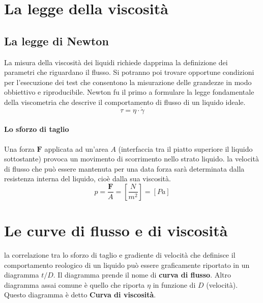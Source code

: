 \section{La legge della viscosità}
\subsection{La legge di Newton}
La misura della viscosità dei liquidi richiede dapprima la definizione dei parametri che riguardano il flusso. Si potranno poi trovare opportune condizioni per l'esecuzione dei test che consentono la misurazione delle grandezze in modo obbiettivo e riproducibile.
Newton fu il primo a formulare la legge fondamentale della viscometria che descrive il comportamento di flusso di un liquido ideale.
\begin{equation}
\tau = \eta \cdot \dot{\gamma}
\label{eqn:1LeggeNewton}
\end{equation}

\paragraph{Lo sforzo di taglio}
Una forza $\mathbf{F}$ applicata ad un'area $A$ (interfaccia tra il piatto superiore il liquido sottostante) provoca un movimento di scorrimento nello strato liquido. la velocità di flusso che può essere mantenuta per una data forza sarà determinata dalla resistenza interna del liquido, cioè dalla sua viscosità.
\begin{equation}
p = \frac{\mathbf{F}}{A} = \left[\frac{N}{m^2}\right] = \left[Pa\right]
\end{equation}

\section{Le curve di flusso e di viscosità}
la correlazione tra lo sforzo di taglio e gradiente di velocità che definisce il comportamento reologico di un liquido può essere graficamente riportato in un diagramma $t/D$. Il diagramma prende il nome di \textbf{curva di flusso}.
Altro diagramma assai comune è quello che riporta $\eta$ in funzione di $D$ (velocità). Questo diagramma è detto \textbf{Curva di viscosità}.

